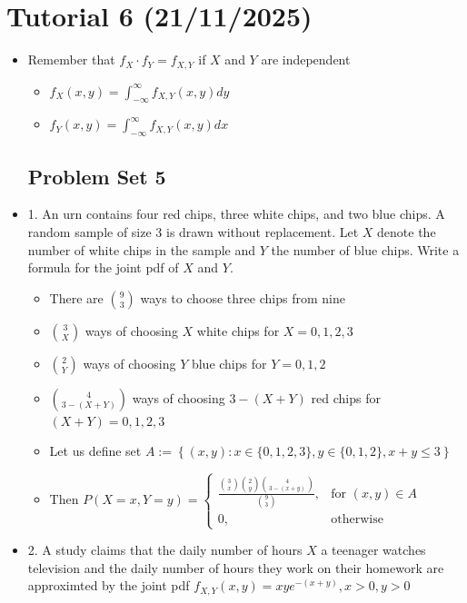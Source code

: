 \documentclass{article}
\begin{document}
\section{Tutorial 6 (21/11/2025)}
\begin{itemize}
    \item Remember that $f_X \cdot f_Y = f_{X,Y}$ if $X$ and $Y$ are independent
    \begin{itemize}
        \item $f_X(x,y) = \int_{-\infty}^\infty f_{X,Y}(x,y) dy$
        \item $f_Y(x,y) = \int_{-\infty}^\infty f_{X,Y}(x,y) dx$
    \end{itemize}
\subsection{Problem Set 5}
    \item 1.  An urn contains four red chips, three white chips, and two blue chips. A random sample of size 3 is drawn without replacement. Let $X$ denote the number of white chips in the sample and $Y$ the number of blue chips. Write a formula for the joint pdf of $X$ and $Y$.
    \begin{itemize}
        \item There are $\binom{9}{3}$ ways to choose three chips from nine
        \item $\binom{3}{X}$ ways of choosing $X$ white chips for $X = 0,1,2,3$
        \item $\binom{2}{Y}$ ways of choosing $Y$ blue chips for $Y=0,1,2$
        \item $\binom{4}{3-(X+Y)}$ ways of choosing $3-(X+Y)$ red chips for $(X+Y)=0,1,2,3$
        \item Let us define set $A := \left\{ (x,y): x \in \{0,1,2,3\}, y \in \{0,1,2\}, x+y \le 3 \right\}$
        \item Then $P(X=x, Y=y) = \left\{ \begin{array}{rl}
            \frac{\binom{3}{x}\binom{2}{y}\binom{4}{3-(x+y)}}{\binom{9}{3}}, & \text{for } (x,y) \in A \\
            0, & \text{otherwise} 
        \end{array} \right.$
    \end{itemize}
    \item 2. A study claims that the daily number of hours $X$ a teenager watches television and the daily number of hours they work on their homework are approximted by the joint pdf $f_{X,Y}(x,y) = xye^{-(x+y)}, x>0, y>0$

\end{itemize}
\end{document}
